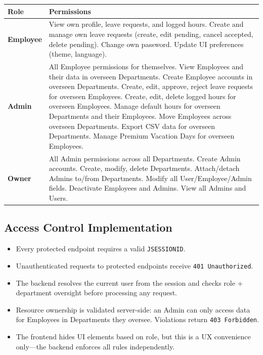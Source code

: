 \documentclass[11pt,a4paper]{article}
\begin{document}
\begin{longtable}{p{2.5cm} p{11cm}}
\toprule
\textbf{Role} & \textbf{Permissions} \\
\midrule
\textbf{Employee} &
    View own profile, leave requests, and logged hours.
    Create and manage own leave requests (create, edit pending, cancel accepted, delete pending).
    Change own password.
    Update UI preferences (theme, language). \\
\midrule
\textbf{Admin} &
    All Employee permissions for themselves.
    View Employees and their data in overseen Departments.
    Create Employee accounts in overseen Departments.
    Create, edit, approve, reject leave requests for overseen Employees.
    Create, edit, delete logged hours for overseen Employees.
    Manage default hours for overseen Departments and their Employees.
    Move Employees across overseen Departments.
    Export CSV data for overseen Departments.
    Manage Premium Vacation Days for overseen Employees. \\
\midrule
\textbf{Owner} &
    All Admin permissions across all Departments.
    Create Admin accounts.
    Create, modify, delete Departments.
    Attach/detach Admins to/from Departments.
    Modify all User/Employee/Admin fields.
    Deactivate Employees and Admins.
    View all Admins and Users. \\
\bottomrule
\end{longtable}

\subsection{Access Control Implementation}

\begin{itemize}[leftmargin=1.5em]
    \item Every protected endpoint requires a valid \texttt{JSESSIONID}.
    \item Unauthenticated requests to protected endpoints receive \texttt{401 Unauthorized}.
    \item The backend resolves the current user from the session and checks role + department oversight before processing any request.
    \item Resource ownership is validated server-side: an Admin can only access data for Employees in Departments they oversee. Violations return \texttt{403 Forbidden}.
    \item The frontend hides UI elements based on role, but this is a UX convenience only---the backend enforces all rules independently.
\end{itemize}
\end{document}
